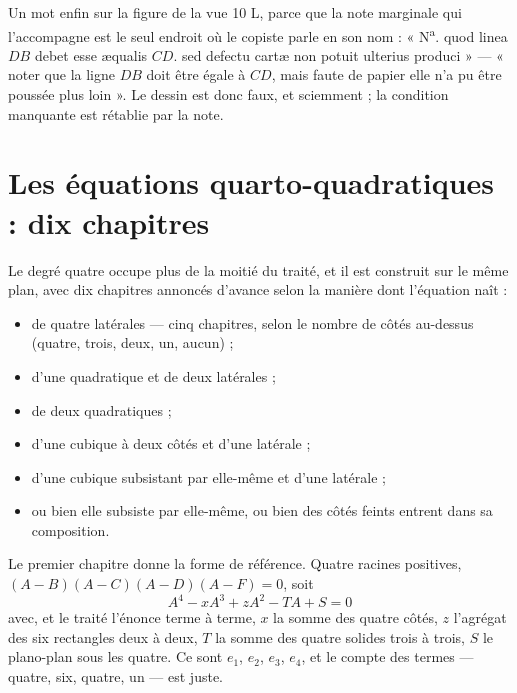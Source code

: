 \documentclass[11pt,a4paper]{article}
\begin{document}
Un mot enfin sur la figure de la vue 10 L, parce que la note marginale qui
l'accompagne est le seul endroit où le copiste parle en son nom : « N\textsuperscript{a}.
quod linea $DB$ debet esse æqualis $CD$. sed defectu cartæ non potuit ulterius
produci » — « noter que la ligne $DB$ doit être égale à $CD$, mais faute de
papier elle n'a pu être poussée plus loin ». Le dessin est donc faux, et
sciemment ; la condition manquante est rétablie par la note.

\section*{Les équations quarto-quadratiques : dix chapitres}

Le degré quatre occupe plus de la moitié du traité, et il est construit sur le
même plan, avec dix chapitres annoncés d'avance selon la manière dont l'équation
naît :

\begin{itemize}
  \item de quatre latérales — cinq chapitres, selon le nombre de côtés au-dessus
    (quatre, trois, deux, un, aucun) ;
  \item d'une quadratique et de deux latérales ;
  \item de deux quadratiques ;
  \item d'une cubique à deux côtés et d'une latérale ;
  \item d'une cubique subsistant par elle-même et d'une latérale ;
  \item ou bien elle subsiste par elle-même, ou bien des côtés feints entrent
    dans sa composition.
\end{itemize}

Le premier chapitre donne la forme de référence. Quatre racines positives,
$(A-B)(A-C)(A-D)(A-F) = 0$, soit
\[ A^4 - xA^3 + zA^2 - TA + S = 0 \]
avec, et le traité l'énonce terme à terme, $x$ la somme des quatre côtés, $z$
l'agrégat des six rectangles deux à deux, $T$ la somme des quatre solides trois
à trois, $S$ le plano-plan sous les quatre. Ce sont $e_1$, $e_2$, $e_3$, $e_4$,
et le compte des termes — quatre, six, quatre, un — est juste.
\end{document}
